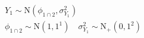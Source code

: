 \begin{equation}
\begin{gathered}
  Y_{1} \sim \text{N}(\phi_{1 \cap 2}, \sigma^{2}_{Y_{1}}) \\
  \phi_{1 \cap 2} \sim \text{N}(1, 1^1) \quad
  \sigma^{2}_{Y_{1}} \sim \text{N}_{+}(0, 1^2)
  \label{eqn:model-1-specification}  
\end{gathered}
\end{equation}